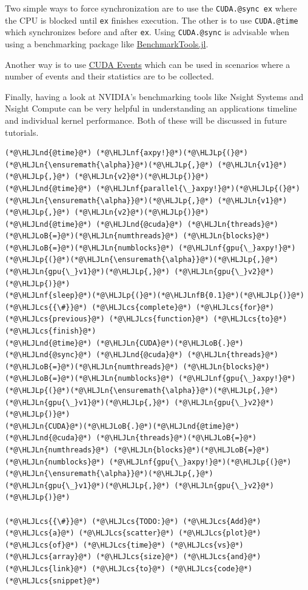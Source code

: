 \documentclass[12pt,a4paper]{article}
\newcommand{\HLJLn}[1]{#1}
\newcommand{\HLJLnd}[1]{\textcolor[RGB]{214,102,97}{#1}}
\newcommand{\HLJLnf}[1]{\textcolor[RGB]{66,102,213}{#1}}
\newcommand{\HLJLnfB}[1]{\textcolor[RGB]{59,151,46}{#1}}
\newcommand{\HLJLoB}[1]{\textcolor[RGB]{102,102,102}{\textbf{#1}}}
\newcommand{\HLJLp}[1]{#1}
\newcommand{\HLJLcs}[1]{\textcolor[RGB]{153,153,119}{\textit{#1}}}
\begin{document}
Two simple ways to force synchronization are to use the \texttt{CUDA.@sync ex} where the CPU is blocked until \texttt{ex} finishes execution. The other is to use \texttt{CUDA.@time} which synchronizes before and after \texttt{ex}. Using \texttt{CUDA.@sync} is advisable when using a benchmarking package like \href{https://github.com/JuliaCI/BenchmarkTools.jl}{BenchmarkTools.jl}.

Another way is to use \href{https://juliagpu.gitlab.io/CUDA.jl/lib/driver/#Event-Management}{CUDA Events} which can be used in scenarios where a number of events and their statistics are to be collected.

Finally, having a look at NVIDIA's benchmarking tools like Nsight Systems and Nsight Compute can be very helpful in understanding an applications timeline and individual kernel performance. Both of these will be discussed in future tutorials.


\begin{lstlisting}
(*@\HLJLnd{@time}@*) (*@\HLJLnf{axpy!}@*)(*@\HLJLp{(}@*)(*@\HLJLn{\ensuremath{\alpha}}@*)(*@\HLJLp{,}@*) (*@\HLJLn{v1}@*)(*@\HLJLp{,}@*) (*@\HLJLn{v2}@*)(*@\HLJLp{)}@*)
(*@\HLJLnd{@time}@*) (*@\HLJLnf{parallel{\_}axpy!}@*)(*@\HLJLp{(}@*)(*@\HLJLn{\ensuremath{\alpha}}@*)(*@\HLJLp{,}@*) (*@\HLJLn{v1}@*)(*@\HLJLp{,}@*) (*@\HLJLn{v2}@*)(*@\HLJLp{)}@*)
(*@\HLJLnd{@time}@*) (*@\HLJLnd{@cuda}@*) (*@\HLJLn{threads}@*)(*@\HLJLoB{=}@*)(*@\HLJLn{numthreads}@*) (*@\HLJLn{blocks}@*)(*@\HLJLoB{=}@*)(*@\HLJLn{numblocks}@*) (*@\HLJLnf{gpu{\_}axpy!}@*)(*@\HLJLp{(}@*)(*@\HLJLn{\ensuremath{\alpha}}@*)(*@\HLJLp{,}@*) (*@\HLJLn{gpu{\_}v1}@*)(*@\HLJLp{,}@*) (*@\HLJLn{gpu{\_}v2}@*)(*@\HLJLp{)}@*)
(*@\HLJLnf{sleep}@*)(*@\HLJLp{(}@*)(*@\HLJLnfB{0.1}@*)(*@\HLJLp{)}@*) (*@\HLJLcs{{\#}}@*) (*@\HLJLcs{complete}@*) (*@\HLJLcs{for}@*) (*@\HLJLcs{previous}@*) (*@\HLJLcs{function}@*) (*@\HLJLcs{to}@*) (*@\HLJLcs{finish}@*)
(*@\HLJLnd{@time}@*) (*@\HLJLn{CUDA}@*)(*@\HLJLoB{.}@*)(*@\HLJLnd{@sync}@*) (*@\HLJLnd{@cuda}@*) (*@\HLJLn{threads}@*)(*@\HLJLoB{=}@*)(*@\HLJLn{numthreads}@*) (*@\HLJLn{blocks}@*)(*@\HLJLoB{=}@*)(*@\HLJLn{numblocks}@*) (*@\HLJLnf{gpu{\_}axpy!}@*)(*@\HLJLp{(}@*)(*@\HLJLn{\ensuremath{\alpha}}@*)(*@\HLJLp{,}@*) (*@\HLJLn{gpu{\_}v1}@*)(*@\HLJLp{,}@*) (*@\HLJLn{gpu{\_}v2}@*)(*@\HLJLp{)}@*)
(*@\HLJLn{CUDA}@*)(*@\HLJLoB{.}@*)(*@\HLJLnd{@time}@*) (*@\HLJLnd{@cuda}@*) (*@\HLJLn{threads}@*)(*@\HLJLoB{=}@*)(*@\HLJLn{numthreads}@*) (*@\HLJLn{blocks}@*)(*@\HLJLoB{=}@*)(*@\HLJLn{numblocks}@*) (*@\HLJLnf{gpu{\_}axpy!}@*)(*@\HLJLp{(}@*)(*@\HLJLn{\ensuremath{\alpha}}@*)(*@\HLJLp{,}@*) (*@\HLJLn{gpu{\_}v1}@*)(*@\HLJLp{,}@*) (*@\HLJLn{gpu{\_}v2}@*)(*@\HLJLp{)}@*)

(*@\HLJLcs{{\#}}@*) (*@\HLJLcs{TODO:}@*) (*@\HLJLcs{Add}@*) (*@\HLJLcs{a}@*) (*@\HLJLcs{scatter}@*) (*@\HLJLcs{plot}@*) (*@\HLJLcs{of}@*) (*@\HLJLcs{time}@*) (*@\HLJLcs{vs}@*) (*@\HLJLcs{array}@*) (*@\HLJLcs{size}@*) (*@\HLJLcs{and}@*) (*@\HLJLcs{link}@*) (*@\HLJLcs{to}@*) (*@\HLJLcs{code}@*) (*@\HLJLcs{snippet}@*)
\end{lstlisting}
\end{document}
